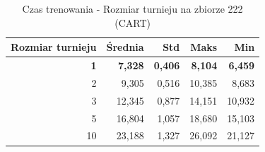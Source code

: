\begin{table}[htbp]
\centering
\small
\setlength{\tabcolsep}{6pt}
\renewcommand{\arraystretch}{1.2}
\caption{Czas trenowania - Rozmiar turnieju na zbiorze 222 (CART)}
\label{tab:CART_tournament_size_222_time}
\begin{tabular}{r|r|r|r|r}
\toprule
Rozmiar turnieju & Średnia & Std & Maks & Min \\
\hline
\textbf{1} & \textbf{7,328} & \textbf{0,406} & \textbf{8,104} & \textbf{6,459} \\
2 & 9,305 & 0,516 & 10,385 & 8,683 \\
3 & 12,345 & 0,877 & 14,151 & 10,932 \\
5 & 16,804 & 1,057 & 18,680 & 15,103 \\
10 & 23,188 & 1,327 & 26,092 & 21,127 \\
\bottomrule
\end{tabular}
\end{table}